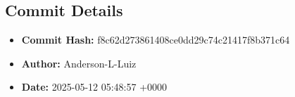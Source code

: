 \documentclass{article}
\begin{document}
\subsection{Commit Details}
\begin{itemize}
    \item \textbf{Commit Hash:} f8c62d273861408ce0dd29c74c21417f8b371c64
    \item \textbf{Author:} Anderson-L-Luiz
    \item \textbf{Date:} 2025-05-12 05:48:57 +0000
\end{itemize}
\hrulefill
\end{document}
